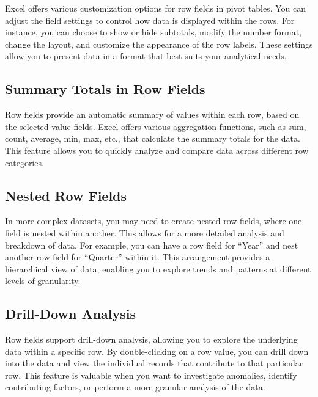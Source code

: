 \documentclass[
]{book}
\begin{document}
Excel offers various customization options for row fields in pivot tables. You can adjust the field settings to control how data is displayed within the rows. For instance, you can choose to show or hide subtotals, modify the number format, change the layout, and customize the appearance of the row labels. These settings allow you to present data in a format that best suits your analytical needs.

\hypertarget{summary-totals-in-row-fields}{%
\subsection{Summary Totals in Row Fields}\label{summary-totals-in-row-fields}}

Row fields provide an automatic summary of values within each row, based on the selected value fields. Excel offers various aggregation functions, such as sum, count, average, min, max, etc., that calculate the summary totals for the data. This feature allows you to quickly analyze and compare data across different row categories.

\hypertarget{nested-row-fields}{%
\subsection{Nested Row Fields}\label{nested-row-fields}}

In more complex datasets, you may need to create nested row fields, where one field is nested within another. This allows for a more detailed analysis and breakdown of data. For example, you can have a row field for ``Year'' and nest another row field for ``Quarter'' within it. This arrangement provides a hierarchical view of data, enabling you to explore trends and patterns at different levels of granularity.

\hypertarget{drill-down-analysis}{%
\subsection{Drill-Down Analysis}\label{drill-down-analysis}}

Row fields support drill-down analysis, allowing you to explore the underlying data within a specific row. By double-clicking on a row value, you can drill down into the data and view the individual records that contribute to that particular row. This feature is valuable when you want to investigate anomalies, identify contributing factors, or perform a more granular analysis of the data.
\end{document}
